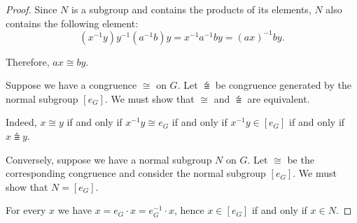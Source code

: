 \begin{proof}
  Since \( N \) is a subgroup and contains the products of its elements, \( N \) also contains the following element:
  \begin{equation*}
    (x^{-1} y) y^{-1} (a^{-1} b) y = x^{-1} a^{-1} b y = (a x)^{-1} b y.
  \end{equation*}

  Therefore, \( ax \cong by \).


   Suppose we have a congruence \( {\cong} \) on \( G \). Let \( {\congdot} \) be congruence generated by the normal subgroup \( [e_G] \). We must show that \( {\cong} \) and \( {\congdot} \) are equivalent.

  Indeed, \( x \cong y \) if and only if \( x^{-1} y \cong e_G \) if and only if \( x^{-1} y \in [e_G] \) if and only if \( x \congdot y \).

   Conversely, suppose we have a normal subgroup \( N \) on \( G \). Let \( {\cong} \) be the corresponding congruence and consider the normal subgroup \( [e_G] \). We must show that \( N = [e_G] \).

  For every \( x \) we have \( x = e_G \cdot x = e_G^{-1} \cdot x \), hence \( x \in [e_G] \) if and only if \( x \in N \).
\end{proof}

